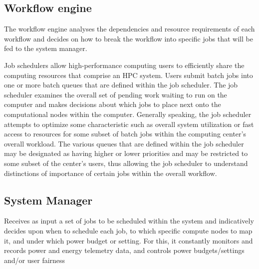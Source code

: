 \subsection{Workflow engine}
The workflow engine analyses the dependencies and resource requirements of each workflow and decides on how to break the workflow into specific jobs that will be fed to the system manager. 

Job schedulers allow high-performance computing users to efficiently share the computing resources that comprise an HPC system. Users submit batch jobs into one or more batch queues that are defined within the job scheduler. The job scheduler examines the overall set of pending work waiting to run on the computer and makes decisions about which jobs to place next onto the computational nodes within the computer. Generally speaking, the job scheduler attempts to optimize some characteristic such as overall system utilization or fast access to resources for some subset of batch jobs within the computing center's overall workload. The various queues that are defined within the job scheduler may be designated as having higher or lower priorities and may be restricted to some subset of the center's users, thus allowing the job scheduler to understand distinctions of importance of certain jobs within the overall workflow.


\subsection{System Manager}
Receives as input a set of jobs to be scheduled within the system and indicatively decides upon when to schedule each job, to which specific compute nodes to map it, and under which power budget or setting. For this, it constantly monitors and records power and energy telemetry data, and controls power budgets/settings and/or user fairness

